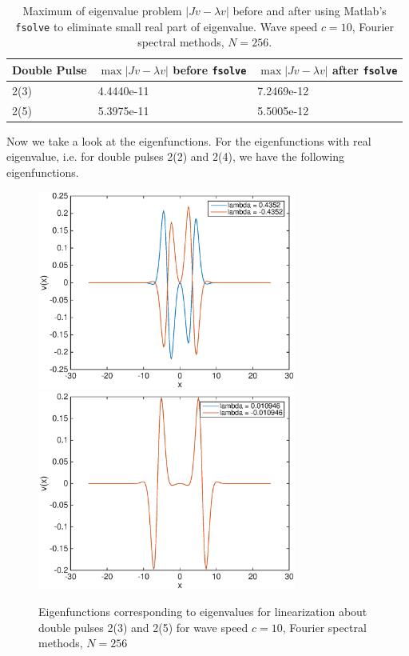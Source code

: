 \documentclass[12pt]{article}
\begin{document}
\begin{table}[H]
\begin{tabular}{l|ll}
 Double Pulse   & $\max{|Jv - \lambda v|}$ before \texttt{fsolve} & $\max{|Jv - \lambda v|}$ after \texttt{fsolve}\\ \hline
  2(3) & 4.4440e-11 & 7.2469e-12 \\
  2(5) & 5.3975e-11 & 5.5005e-12 \\
\end{tabular}
\caption{Maximum of eigenvalue problem $|Jv - \lambda v|$ before and after using Matlab's \texttt{fsolve} to eliminate small real part of eigenvalue. Wave speed $c = 10$, Fourier spectral methods, $N = 256$.}
\end{table}


Now we take a look at the eigenfunctions. For the eigenfunctions with real eigenvalue, i.e. for double pulses 2(2) and 2(4), we have the following eigenfunctions.

\begin{figure}[H]
	\includegraphics[width=8.5cm]{four10dp1eigenfns}
	\includegraphics[width=8.5cm]{four10dp3eigenfns}
	\caption{Eigenfunctions corresponding to eigenvalues for linearization about double pulses 2(3) and 2(5) for wave speed $c = 10$, Fourier spectral methods, $N = 256$}
\end{figure}
\end{document}
